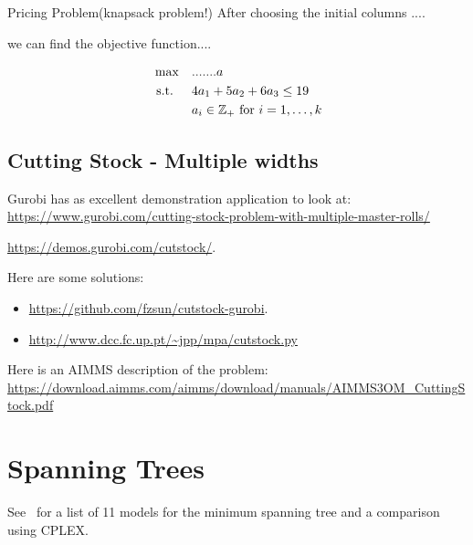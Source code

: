 \documentclass[../open-optimization/open-optimization.tex]{subfiles}
\begin{document}
\begin{example}{Pricing Problem}{(knapsack problem!)}
After choosing the initial columns .... 

we can find the objective function.... 


\begin{equation}
\begin{split}
\max\quad  & .......a\\
\text{ s.t. } \quad & 4 a_1 + 5 a_2 + 6 a_3 \leq 19\\
& a_i \in {\mathbb{Z}}_+ \text{ for } i=1, \dots, k
\end{split}
\end{equation}
\end{example}
\subsection{Cutting Stock - Multiple widths}
Gurobi has as excellent demonstration application to look at:
\url{https://www.gurobi.com/cutting-stock-problem-with-multiple-master-rolls/}

\url{https://demos.gurobi.com/cutstock/}.




Here are some solutions:
\begin{itemize}
\item  \url{https://github.com/fzsun/cutstock-gurobi}.
\item \url{http://www.dcc.fc.up.pt/~jpp/mpa/cutstock.py}
\end{itemize}


Here is an AIMMS description of the problem:\\
\url{https://download.aimms.com/aimms/download/manuals/AIMMS3OM_CuttingStock.pdf}



\section{Spanning Trees}
\label{sec:spanning-tree-models}

%
%
%
%
See~\cite{Abdelmaguid2018} for a list of 11 models for the minimum spanning tree and a comparison using CPLEX.
\end{document}
